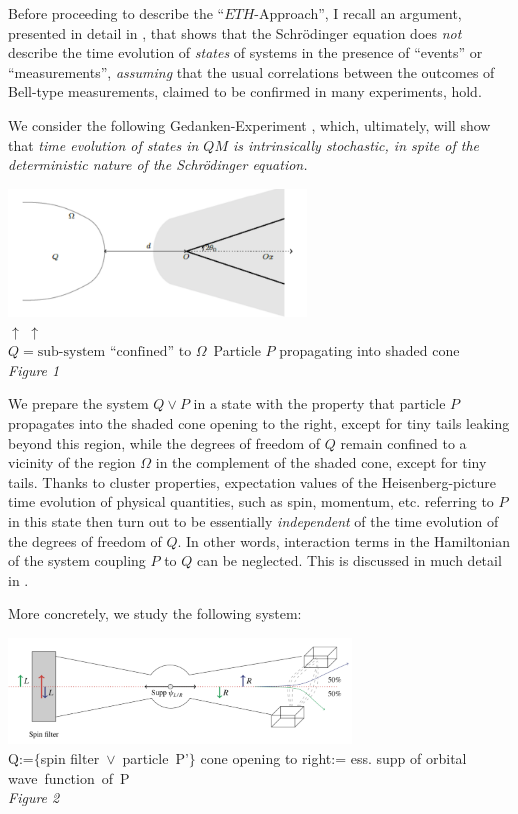 \documentclass[12pt]{article}
\begin{document}
Before proceeding to describe the ``$\textit{ETH}$-Approach'', I recall an argument, presented in detail in \cite{FFS}, that shows that the Schr\"{o}dinger equation does \textit{not} describe the time evolution of \textit{states} of systems in the presence of ``events'' or ``measurements'', \textit{assuming} that the usual correlations between the outcomes of Bell-type measurements, claimed to be confirmed in many experiments, hold.

We consider the following Gedanken-Experiment \cite{FFS}, which, ultimately, will show that {\textit{time evolution of states in $QM$ is intrinsically stochastic, in spite of the deterministic nature of the Schr\"{o}dinger equation.}}
\begin{center}
\includegraphics[width=7.9cm]{Clustering.png}\\
{\small{$\uparrow$}}\hspace{4cm} {\small{$\uparrow$}}\\
$Q= \text{sub-system ``confined'' to } \Omega$\, \hspace{0.3cm} Particle $P$ propagating into shaded cone\\
\textit{Figure 1}
\end{center}
We prepare the system $Q\vee P$ in a state with the property that particle $P$ propagates into the shaded cone opening to the right, except for tiny tails leaking beyond this region, while the degrees of freedom of $Q$ remain confined to a vicinity of the region $\Omega$ in the complement of the shaded cone, except for tiny tails. Thanks to cluster properties, expectation values of the Heisenberg-picture time evolution of physical quantities, such as spin, momentum, etc. referring to $P$ in this state then turn out to be essentially \textit{independent} of the time evolution of the degrees of freedom of $Q$. In other words, interaction terms in the Hamiltonian of 
the system coupling $P$ to $Q$ can be neglected. This is discussed in much detail in \cite{FFS}.

More concretely, we study the following system:
\begin{center}
\includegraphics[width=9.1cm]{Spin-Filter.png}\\
\small{
Q:=$\lbrace$spin filter\, $\vee$\, particle\, P'$\rbrace$ \hspace{0.45cm} cone opening to right:= ess. supp of orbital \mbox{wave function of P\,}\\
}
\vspace{0.1cm}
\textit{Figure 2}
\end{center}
\end{document}
